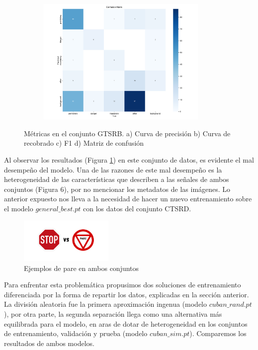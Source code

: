 \documentclass{article}
\begin{document}
\begin{figure}[h]
\begin{subfigure}[b]{0.5\textwidth}
\caption{}
\end{subfigure}
\begin{subfigure}[b]{0.5\textwidth}
\centering
\includegraphics[width=0.9\textwidth]{resources/cuban in general confusion matrix.png}
\caption{}
\end{subfigure}
\caption{Métricas en el conjunto GTSRB. a) Curva de precisión b) Curva de recobrado c) F1 d) Matriz de confusión}
\label{fig:results in cuban general}
\end{figure}

Al observar los resultados (Figura \ref{fig:results in cuban general}) en este conjunto de datos, es evidente el mal desempeño del modelo. Una de las razones de este mal desempeño es la heterogeneidad de las características que describen a las señales de ambos conjuntos (Figura 6), por no mencionar los metadatos de las imágenes. Lo anterior expuesto nos lleva a la necesidad de hacer un nuevo entrenamiento sobre el modelo $general\_best.pt$ con los datos del conjunto CTSRD.

\begin{figure}[h]
\centering
\includegraphics[width=0.4\textwidth]{resources/vs.png}
\caption{Ejemplos de pare en ambos conjuntos}
\label{fig:vs}
\end{figure}

Para enfrentar esta problemática propusimos dos soluciones de entrenamiento diferenciada por la forma de repartir los datos, explicadas en la sección anterior. La división aleatoria fue la primera aproximación ingenua (modelo $cuban\_rand.pt$), por otra parte, la segunda separación llega como una alternativa más equilibrada para el modelo, en aras de dotar de heterogeneidad en los conjuntos de entrenamiento, validación y prueba (modelo $cuban\_sim.pt$). Comparemos los resultados de ambos modelos.
\end{document}
